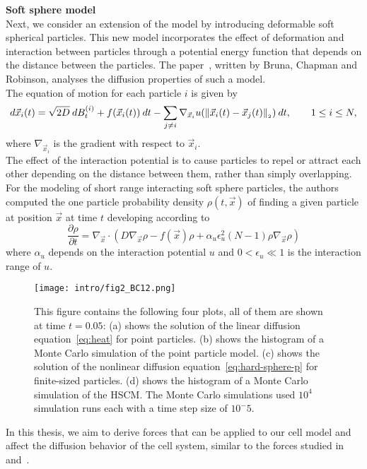 \textbf{Soft sphere model} \\
Next, we consider an extension of the model by introducing deformable soft spherical particles. 
This new model incorporates the effect of deformation and interaction between particles through a potential energy function that depends on the distance between the particles.
The paper~\cite{Bruna2017}, written by Bruna, Chapman and Robinson, analyses the diffusion properties of such a model. \\
The equation of motion for each particle $i$ is given by
\begin{equation}
d\vec{x}_i(t) = \sqrt{2D} \: dB_t^{(i)} + f(\vec{x}_i(t))\: dt - \sum\limits_{j\neq i} \nabla_{\vec{x}_i} u (\norm[ \vec{x}_i(t) - \vec{x}_j(t)]) \: dt, \qquad 1 \leq i \leq N,
\end{equation}
where $\nabla_{\vec{x}_i}$ is the gradient with respect to $\vec{x}_i$. \\
The effect of the interaction potential is to cause particles to repel or attract each other depending on the distance between them, rather than simply overlapping. \\
For the modeling of short range interacting soft sphere particles, the authors computed the one particle probability density $\rho(t, \vec{x})$ of finding a given particle at position $\vec{x}$ at time $t$ developing according to
\begin{equation}
\dfrac{\partial \rho}{\partial t} = \nabla_{\vec{x}} \cdot (D \nabla_{\vec{x}} \rho - f(\vec{x}) \rho + \alpha_u \epsilon_u^2(N-1)\rho \nabla_{\vec{x}} \rho)
\end{equation}
where $\alpha_u$ depends on the interaction potential $u$ and $0 < \epsilon_u \ll 1$ is the interaction range of $u$.
\begin{figure}
	\centering
    \texttt{[image: intro/fig2\_BC12.png]}
    \caption{
    This figure contains the following four plots, all of them are shown at time \( t=0.05 \): 
    (a) shows the solution of the linear diffusion equation~\ref{eq:heat} for point particles. 
    (b) shows the histogram of a Monte Carlo simulation of the point particle model. 
    (c) shows the solution of the nonlinear diffusion equation~\ref{eq:hard-sphere-p} for finite-sized particles. 
    (d) shows the histogram of a Monte Carlo simulation of the HSCM. 
    The Monte Carlo simulations used $10^4$ simulation runs each with a time step size of $10^-5$.
    }
    \label{fig:fig2BC12}
\end{figure}
In this thesis, we aim to derive forces that can be applied to our cell model and affect the diffusion behavior of the cell system, similar to the forces studied in~\cite{Bruna2012} and~\cite{Bruna2017}. \\



